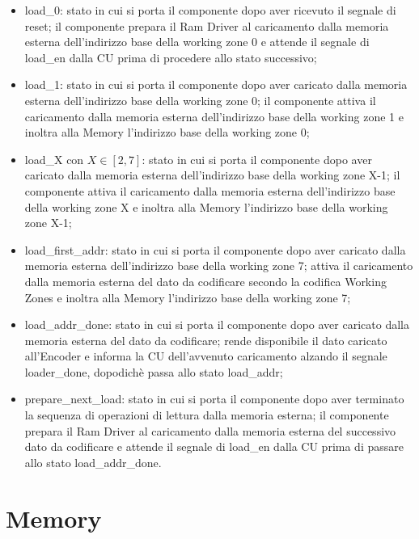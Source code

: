 \documentclass[10pt,english, openany]{book}
\begin{document}
\begin{itemize}
  \item load\_0: stato in cui si porta il componente dopo aver ricevuto il            segnale di reset; il componente prepara il Ram Driver al caricamento          dalla memoria esterna dell’indirizzo base della working zone 0 e attende       il segnale di load\_en dalla CU prima di procedere allo stato                 successivo;
  \item load\_1: stato in cui si porta il componente dopo aver caricato dalla         memoria esterna dell’indirizzo base della working zone 0; il componente       attiva il caricamento dalla memoria esterna dell’indirizzo base della         working zone 1 e inoltra alla Memory l’indirizzo base della working zone       0;
  \item load\_X con $X \in [2, 7]$: stato in cui si porta il componente dopo          aver caricato dalla memoria esterna dell’indirizzo base della working         zone X-1; il componente attiva il caricamento dalla memoria esterna           dell’indirizzo base della working zone X e inoltra alla Memory                l’indirizzo base della working zone X-1;
  \item load\_first\_addr: stato in cui si porta il componente dopo aver              caricato dalla memoria esterna dell’indirizzo base della working zone 7;       attiva il caricamento dalla memoria esterna del dato da codificare            secondo la codifica Working Zones e inoltra alla Memory l’indirizzo base       della working zone 7;
  \item load\_addr\_done: stato in cui si porta il componente dopo aver caricato       dalla memoria esterna del dato da codificare; rende disponibile il dato       caricato all’Encoder e  informa la CU dell’avvenuto caricamento alzando       il segnale loader\_done, dopodichè passa allo stato load\_addr;
  \item prepare\_next\_load: stato in cui si porta il componente dopo aver            terminato la sequenza di operazioni di lettura dalla memoria esterna; il       componente prepara il Ram Driver al caricamento dalla memoria esterna         del successivo dato da codificare e attende il segnale di load\_en dalla       CU prima di passare allo stato load\_addr\_done.
\end{itemize}

\section{Memory}
\end{document}
